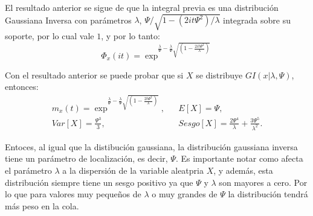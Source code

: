 El resultado anterior se sigue de que la integral previa es una distribución Gaussiana Inversa con parámetros $\lambda$, $\Psi/\sqrt{1-(2it\Psi^{2})/\lambda}$ integrada sobre su soporte, por lo cual vale $1$, y por lo tanto:
\begin{equation}
	\Phi_{x}(it)=\exp^{\frac{\lambda}{\Psi}-\frac{\lambda}{\Psi}\sqrt{(1-\frac{2it\Psi^{2}}{\lambda})}}
\end{equation}

Con el resultado anterior se puede probar que si $X$ se distribuye $GI(x|\lambda,\Psi)$, entonces:
\begin{eqnarray}
	m_{x}(t)= \exp^{\frac{\lambda}{\Psi}-\frac{\lambda}{\Psi}\sqrt{(1-\frac{2t\Psi^{2}}{\lambda})}},
	&&
	E[X]=\Psi,
	\nonumber\\
	Var[X]=\frac{\Psi^{3}}{3},
	&&
	Sesgo[X]=\frac{2\Psi^{4}}{\lambda}+\frac{3\Psi^{5}}{\lambda^{2}}.
	\nonumber
\end{eqnarray}

Entoces, al igual que la distibución gaussiana, la distribución gaussiana inversa tiene un parámetro de localización, es decir, $\Psi$. Es importante notar como afecta el parámetro $\lambda$ a la dispersión de la variable aleatpria $X$, y además, esta distribución siempre tiene un sesgo positivo ya que $\Psi$ y $\lambda$ son mayores a cero. Por lo que para valores muy pequeños de $\lambda$ o muy grandes de $\Psi$ la distribución tendrá más peso en la cola. 



